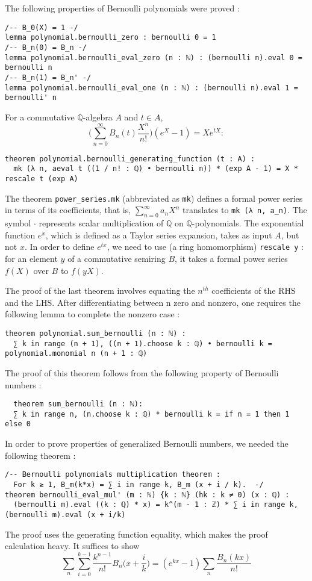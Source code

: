 \documentclass[a4paper,UKenglish,cleveref, autoref, thm-restate]{lipics-v2021}
\newcommand{\lean}[1]{\texttt{#1}\xspace} %
\begin{document}
The following properties of Bernoulli polynomials were proved :
\begin{lstlisting}
/-- B_0(X) = 1 -/
lemma polynomial.bernoulli_zero : bernoulli 0 = 1
/-- B_n(0) = B_n -/
lemma polynomial.bernoulli_eval_zero (n : ℕ) : (bernoulli n).eval 0 = bernoulli n
/-- B_n(1) = B_n' -/
lemma polynomial.bernoulli_eval_one (n : ℕ) : (bernoulli n).eval 1 = bernoulli' n
\end{lstlisting}
For a commutative $\mathbb{Q}$-algebra $A$ and $t \in A$, 
$$ \bigg( \sum_{n = 0}^{\infty} B_n(t) \frac{X^n}{n!} \bigg) (e^X - 1) = X e^{tX} : $$
\begin{lstlisting}
theorem polynomial.bernoulli_generating_function (t : A) : 
  mk (λ n, aeval t ((1 / n! : ℚ) • bernoulli n)) * (exp A - 1) = X * rescale t (exp A)
\end{lstlisting}
The theorem \lean{power\_series.mk} (abbreviated as \lean{mk}) defines a formal power series in terms of its
coefficients, that is, $\sum_{n = 0}^{\infty} a_n X^n$ translates to \lean{mk (λ n, a\_n)}. 
The symbol \lean{$\cdot$} represents scalar multiplication of $\mathbb{Q}$ on $\mathbb{Q}$-polynomials. 
The exponential function $e^{x}$, which is defined as a Taylor series expansion,
takes as input $A$, but not $x$. In order to define $e^{tx}$, we need to use
(a ring homomorphism) \lean{rescale y} : for an element $y$ of a commutative semiring $B$, it 
takes a formal power series $f(X)$ over $B$ to $f(yX)$. 

The proof of the last theorem involves equating the $n^{th}$ coefficients of the RHS and the LHS.
After differentiating between n zero and nonzero, one requires the following lemma to complete the
nonzero case :
\begin{lstlisting}
theorem polynomial.sum_bernoulli (n : ℕ) :
  ∑ k in range (n + 1), ((n + 1).choose k : ℚ) • bernoulli k = polynomial.monomial n (n + 1 : ℚ)
\end{lstlisting}
The proof of this theorem follows from the following property of Bernoulli numbers :
\begin{lstlisting}
  theorem sum_bernoulli (n : ℕ):
  ∑ k in range n, (n.choose k : ℚ) * bernoulli k = if n = 1 then 1 else 0
\end{lstlisting}
In order to prove properties of generalized Bernoulli numbers, we needed the following theorem :
\begin{lstlisting}
/-- Bernoulli polynomials multiplication theorem : 
  For k ≥ 1, B_m(k*x) = ∑ i in range k, B_m (x + i / k).  -/
theorem bernoulli_eval_mul' (m : ℕ) {k : ℕ} (hk : k ≠ 0) (x : ℚ) :
  (bernoulli m).eval ((k : ℚ) * x) = k^(m - 1 : ℤ) * ∑ i in range k, (bernoulli m).eval (x + i/k) 
\end{lstlisting}
The proof uses the generating function equality, which makes the proof calculation heavy. It suffices to show 
$$ \sum_n \sum_{i = 0}^{k - 1} \frac{k^{n - 1}}{n!} B_n \bigg(x + \frac{i}{k} \bigg) = (e^{kx} - 1) \sum_n \frac{B_n (kx)}{n!} $$
\end{document}
